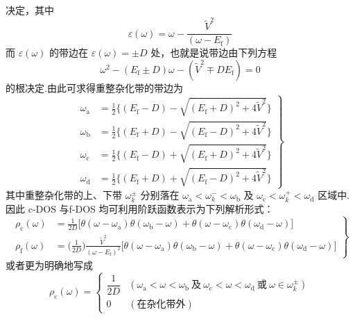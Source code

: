 决定，其中
\begin{equation}
  \varepsilon(\omega)=\omega-\frac{\widetilde{V}^{2}}{(\omega-E_{\mathrm{f}})}
\end{equation}
而 $\varepsilon(\omega)$ 的带边在 $\varepsilon(\omega)=\pm D$ 处，也就是说带边由下列方程
\begin{equation}
  \omega^{2}-(E_{\mathrm{f}}\pm D)\omega-(\widetilde{V}^{2}\mp DE_{\mathrm{f}})=0
\end{equation}
的根决定.由此可求得重整杂化带的带边为
\begin{equation}
\left.\begin{aligned}
  \omega_{\mathrm{a}}&=\frac{1}{2}\bigl\{(E_{\mathrm{f}}-D)-\sqrt{(E_{\mathrm{f}}+D)^{2}+4\widetilde{V}^{2}}\bigr\}\\
  \omega_{\mathrm{b}}&=\frac{1}{2}\bigl\{(E_{\mathrm{f}}+D)-\sqrt{(E_{\mathrm{f}}-D)^{2}+4\widetilde{V}^{2}}\bigr\}\\
  \omega_{\mathrm{c}}&=\frac{1}{2}\bigl\{(E_{\mathrm{f}}-D)+\sqrt{(E_{\mathrm{f}}+D)^{2}+4\widetilde{V}^{2}}\bigr\}\\
  \omega_{\mathrm{d}}&=\frac{1}{2}\bigl\{(E_{\mathrm{f}}+D)+\sqrt{(E_{\mathrm{f}}-D)^{2}+4\widetilde{V}^{2}}\bigr\}
\end{aligned}\right\}
\end{equation}
其中重整杂化带的上、下带 $\omega_{k}^{\pm}$ 分别落在 $\omega_{\mathrm{a}}<\omega_{k}^{-}<\omega_{\mathrm{b}}$ 及 $\omega_{\mathrm{c}}<\omega_{k}^{+}<\omega_{\mathrm{d}}$ 区域中.因此 c-DOS 与f-DOS 均可利用阶跃函数表示为下列解析形式：
\begin{equation}
\left.\begin{aligned}
  \rho_{\mathrm{c}}(\omega)&=\frac{1}{2D}\bigl[\theta(\omega-\omega_{\mathrm{a}})\theta(\omega_{\mathrm{b}}-\omega)
  +\theta(\omega-\omega_{\mathrm{c}})\theta(\omega_{\mathrm{d}}-\omega)\bigr]\\
  \rho_{\mathrm{f}}(\omega)&=\biggl(\frac{1}{2D}\biggr)\frac{\widetilde{V}^{2}}{(\omega-E_{\mathrm{f}})^{2}}
  \bigl[\theta(\omega-\omega_{\mathrm{a}})\theta(\omega_{\mathrm{b}}-\omega)
  +\theta(\omega-\omega_{\mathrm{c}})\theta(\omega_{\mathrm{d}}-\omega)\bigr]
\end{aligned}\right\}
\end{equation}
或者更为明确地写成
\begin{equation}
  \rho_{\mathrm{c}}(\omega)=\begin{cases}
    \dfrac{1}{2D} & (\omega_{\mathrm{a}}<\omega<\omega_{\mathrm{b}}\ \text{及}\ \omega_{\mathrm{c}}<\omega<\omega_{\mathrm{d}}\ \text{或}\ \omega\in\omega_{k}^{\pm})\\[2mm]
    0 & (\text{在杂化带外})
  \end{cases}
\end{equation}
